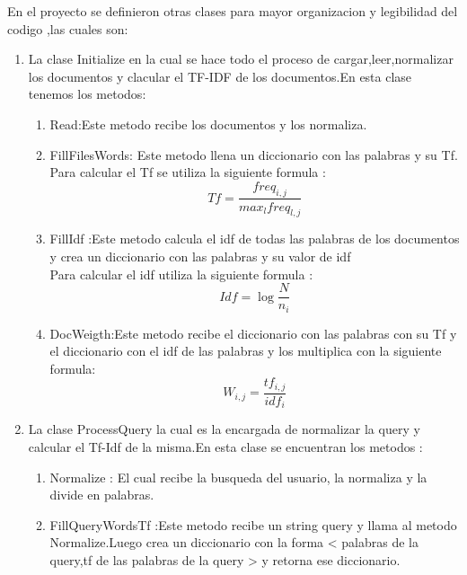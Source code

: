 \documentclass[12 pts,spanish]{article}
\begin{document}
En el proyecto se definieron otras clases para mayor organizacion y legibilidad del codigo ,las cuales son:
\begin{enumerate}
    \item La clase Initialize en la cual se hace todo el proceso de cargar,leer,normalizar los documentos y clacular el TF-IDF de los documentos.En esta clase tenemos los metodos:
    \begin{enumerate}
        \item Read:Este metodo recibe los documentos y los normaliza.
        \item FillFilesWords: Este metodo llena un diccionario con las palabras y su Tf.\\Para calcular el Tf se utiliza la siguiente formula :
        \begin{equation}
            Tf = \frac{freq_{i,j}}{max_{l}freq_{ l,j}}
        \end{equation}
         
        \item FillIdf :Este metodo calcula el idf de todas las palabras de los documentos y crea un diccionario con las palabras y su valor de idf \\Para calcular el idf utiliza la siguiente formula :
        \begin{equation}
            Idf=\log{\frac{N}{n_{i}}}
        \end{equation}

        \item DocWeigth:Este metodo recibe el diccionario con las palabras con su Tf y el diccionario con el idf de las palabras y los multiplica con la siguiente formula:
        \begin{equation}
            W_{i,j}=\frac{tf_{i,j}}{idf_{i}}
        \end{equation} 

    \end{enumerate}
    \item La clase ProcessQuery la cual es la encargada de normalizar la query y calcular el Tf-Idf de la misma.En esta clase se encuentran los metodos :
    \begin{enumerate}
        \item Normalize : El cual recibe la busqueda del usuario, la normaliza y la divide en palabras.
        
        \item FillQueryWordsTf :Este metodo recibe un string query y llama al metodo Normalize.Luego crea un  diccionario con la forma < palabras de la query,tf de las palabras de la query > y retorna ese diccionario.
        

\end{enumerate}
\end{enumerate}
\end{document}

